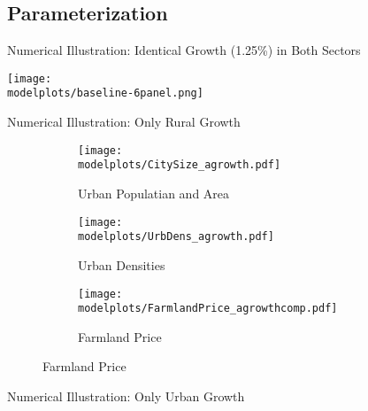 \documentclass[aspectratio=169]{beamer}
\begin{document}
\subsection{Parameterization}


\begin{v75mins}
\begin{frame}{Numerical Illustration: Identical Growth (1.25\%) in Both Sectors}

	\begin{adjustbox}{center}
		\texttt{[image: \\modelplots/baseline-6panel.png]}
	\end{adjustbox}
	
\end{frame}

\begin{frame}{Numerical Illustration: Only Rural Growth}
\begin{figure}
	
	\begin{subfigure}[t]{0.32\textwidth}
		\begin{centering}
			\texttt{[image: \\modelplots/CitySize\_agrowth.pdf]}
			\caption{Urban Populatian and Area}
		\end{centering}
	\end{subfigure}
	\hfill
	\begin{subfigure}[t]{0.32\textwidth}
		\begin{centering}
			\texttt{[image: \\modelplots/UrbDens\_agrowth.pdf]}
			\caption{Urban Densities}
		\end{centering}
	\end{subfigure}
	\hfill
	\begin{subfigure}[t]{0.32\textwidth}
		\begin{centering}
			\texttt{[image: \\modelplots/FarmlandPrice\_agrowthcomp.pdf]}\end{centering}
			\caption{Farmland Price}
	\end{subfigure}
\end{figure}
\end{frame}

\begin{frame}{Numerical Illustration: Only Urban Growth}
	\begin{figure}
		

\end{figure}
\end{frame}
\end{v75mins}
\end{document}
